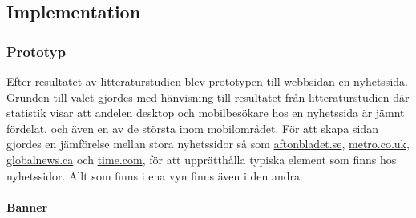 \documentclass[11pt]{article}
\begin{document}
\subsection{Implementation}
\subsubsection{Prototyp}
Efter resultatet av litteraturstudien blev prototypen till webbsidan en nyhetssida. Grunden till valet gjordes med hänvisning till resultatet från litteraturstudien där statistik visar att andelen desktop och mobilbesökare hos en nyhetssida är jämnt fördelat, och även en av de största inom mobilområdet. För att skapa sidan gjordes en jämförelse mellan stora nyhetssidor så som \href{http://www.aftonbladet.se}{aftonbladet.se}, \href{http://www.metro.co.uk}{metro.co.uk}, \href{http://www.globalnews.ca}{globalnews.ca} och \href{http://www.time.com}{time.com}, för att upprätthålla typiska element som finns hos nyhetssidor. Allt som finns i ena vyn finns även i den andra.

\paragraph{Banner}\mbox{}
\end{document}
